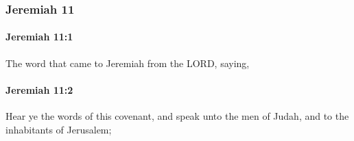 	\subsubsection{Jeremiah 11} %
		\label{JEREMIAH-11}

		\paragraph{Jeremiah 11:1} %
			\label{JEREMIAH-11-1}

			The word that came to Jeremiah from the LORD, saying,


		\paragraph{Jeremiah 11:2} %
			\label{JEREMIAH-11-2}

			Hear ye the words of this covenant, and speak unto the men of Judah, and to the inhabitants of Jerusalem;


